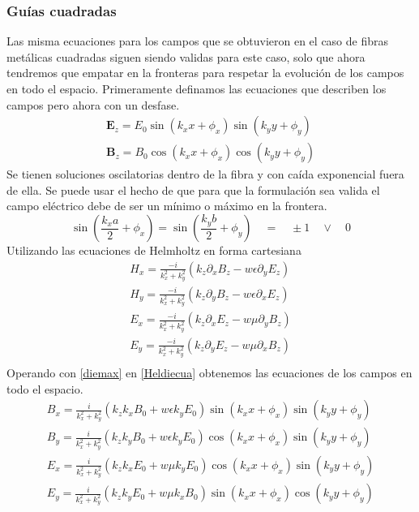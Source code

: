 \subsubsection{Guías cuadradas}
Las misma ecuaciones para los campos que se obtuvieron en el caso de fibras metálicas cuadradas siguen siendo validas para este caso, solo que ahora tendremos que empatar en la fronteras para respetar la evolución de los campos en todo el espacio. Primeramente definamos las ecuaciones que describen los campos pero ahora con un desfase.
\begin{eqnarray}\label{diemax}
\mathbf{E}_{z}=E_{0} \sin(k_{x}x+\phi_{x}) \sin(k_{y}y+\phi_{y}) \\
\mathbf{B}_{z}=B_{0} \cos(k_{x}x+\phi_{x}) \cos(k_{y}y+\phi_{y}) 
\end{eqnarray}
Se tienen soluciones oscilatorias dentro de la fibra y con caída exponencial fuera de ella. Se puede usar el hecho de que para que la formulación sea valida el campo eléctrico debe de ser un mínimo o máximo en la frontera.
\begin{equation}
	\sin(\frac{k_{x}a}{2}+\phi_{x})=\sin(\frac{k_{y}b}{2}+\phi_{y}) \quad = \quad \pm 1 \quad \vee \quad 0
\end{equation}
Utilizando las ecuaciones de Helmholtz en forma cartesiana
\begin{eqnarray} \label{Heldiecua}
H_{x}=\frac{-i}{k_{x}^2+k_{y}^2}(k_{z}\partial_{x}B_{z}-w \epsilon \partial_{y}E_{z}) \\
H_{y}=\frac{-i}{k_{x}^2+k_{y}^2}(k_{z}\partial_{y}B_{z}-w \epsilon \partial_{x}E_{z}) \\
E_{x}=\frac{-i}{k_{x}^2+k_{y}^2}(k_{z}\partial_{x}E_{z}-w \mu \partial_{y}B_{z}) \\
E_{y}=\frac{-i}{k_{x}^2+k_{y}^2}(k_{z}\partial_{y}E_{z}-w \mu \partial_{x}B_{z}) \\
\end{eqnarray}
Operando con \ref{diemax} en \ref{Heldiecua} obtenemos las ecuaciones de los campos en todo el espacio.
\begin{eqnarray}
B_{x}=\frac{i}{k_{x}^2+k_{y}^2}(k_{z}k_{x}B_{0}+w\epsilon k_{y}E_{0})\sin(k_{x}x+\phi_{x})\sin(k_{y}y+\phi_{y})\\
B_{y}=\frac{i}{k_{x}^2+k_{y}^2}(k_{z}k_{y}B_{0}+w\epsilon k_{y}E_{0})\cos(k_{x}x+\phi_{x})\sin(k_{y}y+\phi_{y})\\
E_{x}=\frac{i}{k_{x}^2+k_{y}^2}(k_{z}k_{x}E_{0}+w\mu k_{y}E_{0})\cos(k_{x}x+\phi_{x})\sin(k_{y}y+\phi_{y})\\
E_{y}=\frac{i}{k_{x}^2+k_{y}^2}(k_{z}k_{y}E_{0}+w\mu k_{x}B_{0})\sin(k_{x}x+\phi_{x})\cos(k_{y}y+\phi_{y})\\
\end{eqnarray}
